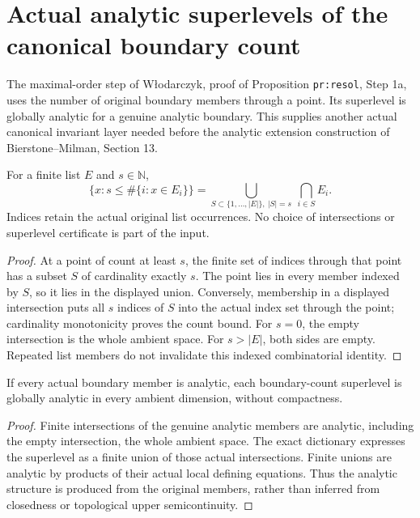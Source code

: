 \section{Actual analytic superlevels of the canonical boundary count}

The maximal-order step of W{\l}odarczyk\cite{wlodarczyk05-hironaka},
proof of Proposition \texttt{pr:resol}, Step 1a, uses the number of
original boundary members through a point. Its superlevel is globally
analytic for a genuine analytic boundary. This supplies another actual
canonical invariant layer needed before the analytic extension construction
of Bierstone--Milman\cite{bierstone-milman97-invent-math}, Section 13.

\begin{lemma}
\label{hir:boundary-count-superlevel-intersection-dictionary}
\leanok
For a finite list $E$ and $s\in\mathbb N$,
\[
 \{x:s\le \#\{i:x\in E_i\}\}
 =\bigcup_{S\subset\{1,\ldots,|E|\},\ |S|=s}\ \bigcap_{i\in S} E_i.
\]
Indices retain the actual original list occurrences. No choice of
intersections or superlevel certificate is part of the input.
\end{lemma}
\begin{proof}
At a point of count at least $s$, the finite set of indices through that
point has a subset $S$ of cardinality exactly $s$. The point lies in every
member indexed by $S$, so it lies in the displayed union. Conversely,
membership in a displayed intersection puts all $s$ indices of $S$ into
the actual index set through the point; cardinality monotonicity proves
the count bound. For $s=0$, the empty intersection is the whole ambient
space. For $s>|E|$, both sides are empty. Repeated list members do not
invalidate this indexed combinatorial identity.
\end{proof}

\begin{theorem}
\label{hir:boundary-count-global-analytic-superlevels}
\leanok
If every actual boundary member is analytic, each boundary-count
superlevel is globally analytic in every ambient dimension, without
compactness.
\end{theorem}
\begin{proof}
Finite intersections of the genuine analytic members are analytic,
including the empty intersection, the whole ambient space. The exact
dictionary expresses the superlevel as a finite union of those actual
intersections. Finite unions are analytic by products of their actual
local defining equations. Thus the analytic structure is produced from
the original members, rather than inferred from closedness or topological
upper semicontinuity.
\end{proof}

